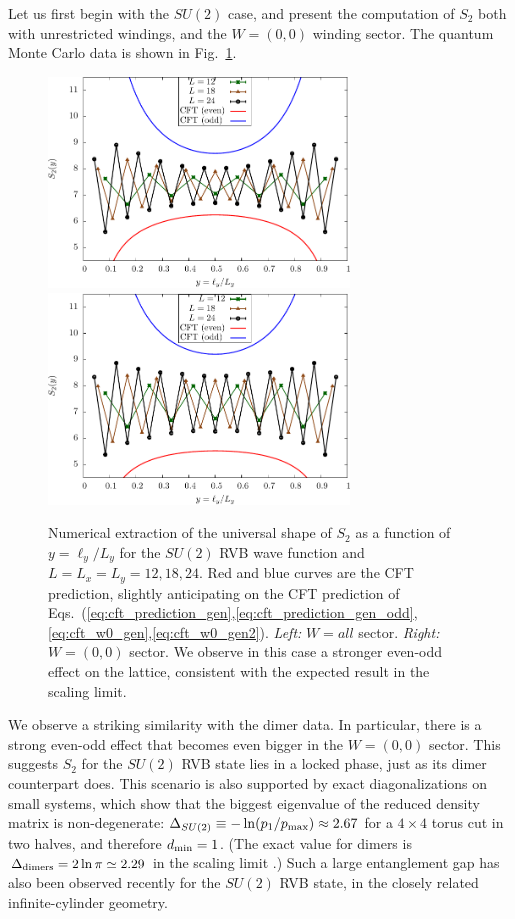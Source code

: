 \documentclass[11pt]{iopart}
\begin{document}
Let us first begin with the $SU(2)$ case, and present the computation of $S_2$ both with unrestricted windings, and the $W=(0,0)$ winding sector. The quantum Monte Carlo data is shown in Fig.~\ref{fig:SU2_shape}.\begin{figure}[ht]
 \begin{center}
  \includegraphics[width=8cm]{./figures/SU2_shape.pdf}
  \includegraphics[width=8cm]{./figures/SU2_shape_w0.pdf}
 \end{center}
\caption{Numerical extraction of the universal shape of $S_2$ as a function of $y=\ell_y/L_y$ for the $SU(2)$ RVB wave function and $L=L_x=L_y=12,18,24$. Red and blue curves are the CFT prediction, slightly anticipating on the CFT prediction of Eqs.~(\ref{eq:cft_prediction_gen},\ref{eq:cft_prediction_gen_odd},\ref{eq:cft_w0_gen},\ref{eq:cft_w0_gen2}). \emph{Left:} $W=all$ sector.  \emph{Right:} $W=(0,0)$ sector. We observe in this case a stronger even-odd effect on the lattice, consistent with the expected result in the scaling limit.}
\label{fig:SU2_shape}
\end{figure}
We observe a striking similarity with the dimer data. In particular, there is a strong even-odd effect that becomes even bigger in the $W=(0,0)$ sector.
This suggests $S_2$ for the $SU(2)$ RVB state lies in a locked phase, just as its dimer counterpart does. 
This scenario is also supported by exact diagonalizations on small systems, which show that the biggest eigenvalue of the reduced density matrix is non-degenerate:  $\Delta_{SU(2)}\equiv -\ln (p_1/p_{\rm max}) \approx 2.67$ for a $4\times 4$ torus cut in two halves, and therefore $d_{\rm min}=1$. (The exact value for dimers is $\Delta_{\rm dimers}=2\ln \pi\simeq 2.29$ in the scaling limit \cite{Stephan2012}.) Such a large entanglement gap has also been observed recently for the $SU(2)$ RVB state, in the closely related infinite-cylinder geometry\cite{Poilblanc}.
\end{document}
